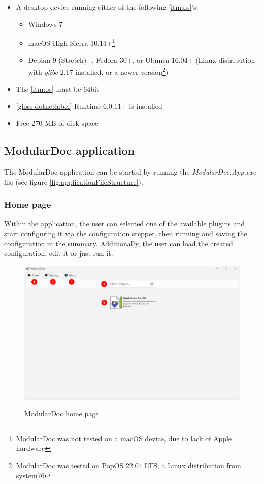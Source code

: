 \begin{itemize}
    \item A desktop device running either of the following \ref{itm:os}'s:
    \begin{itemize}
        \item Windows 7+
        \item macOS High Sierra 10.13+\footnote{ModularDoc was not tested on a macOS device, due to lack of Apple hardware}
        \item  Debian 9 (Stretch)+, Fedora 30+, or Ubuntu 16.04+ (Linux distribution with \textit{glibc} 2.17 installed, or a newer version\footnote{ModularDoc was tested on PopOS 22.04 LTS, a Linux distribution from system76})
    \end{itemize}
    \item The \ref{itm:os} must be 64bit
    \item \ref{gloss:dotnetlabel} Runtime 6.0.11+ is installed
    \item Free 270 MB of disk space
\end{itemize}

\subsection{ModularDoc application}

The ModularDoc application can be started by running the \textit{ModularDoc.App.exe} file (see figure \ref{fig:applicationFileStructure}).

\subsubsection{Home page}

Within the application, the user can selected one of the available plugins and start configuring it via the configuration stepper, then running and saving the configuration in the summary.
Additionally, the user can load the created configuration, edit it or just run it.

\begin{figure}[H]
    \includegraphics[width=\linewidth]{img/modularDocHomePage.png}
    \label{fig:modularDocHome}
    \caption{ModularDoc home page}
\end{figure}

